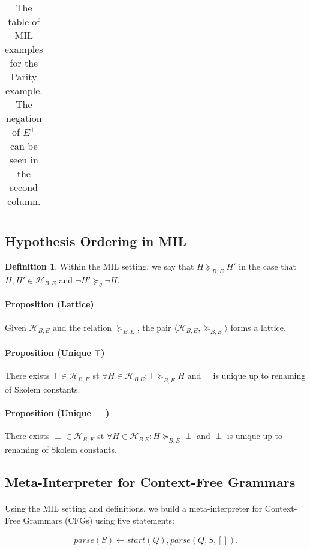 \documentclass{article}
\theoremstyle{plain}
\theoremstyle{definition}
\newtheorem{defn}[thm]{Definition} %
\begin{document}
\begin{multicols}{2}
\begin{table}[H]
\begin{tabular}{ | l | l | l | }
\hline
\end{tabular}
\caption{The table of MIL examples for the Parity example. The negation of $E^+$ can be seen in the second column.}
\end{table}

\subsection{Hypothesis Ordering in MIL}

\begin{defn}Within the MIL setting, we say that $H \succeq_{B,E} H'$ in the case that $H, H' \in \mathcal{H}_{B,E}$ and $\lnot H' \succeq_\theta \lnot H$.\end{defn}

\paragraph{Proposition (Lattice)} Given $\mathcal{H}_{B,E}$ and the relation $\succeq_{B,E}$, the pair $\langle \mathcal{H}_{B,E}, \succeq_{B,E} \rangle$ forms a lattice.

\paragraph{Proposition (Unique $\top$)} There exists $\top \in \mathcal{H}_{B,E}$ st $\forall H \in \mathcal{H}_{B.E}: \top \succeq_{B,E} H$ and $\top$ is unique up to renaming of Skolem constants.

\paragraph{Proposition (Unique $\perp$)} There exists $\perp \in \mathcal{H}_{B,E}$ st $\forall H \in \mathcal{H}_{B.E}: H \succeq_{B,E} \perp$ and $\perp$ is unique up to renaming of Skolem constants.

\subsection{Meta-Interpreter for Context-Free Grammars}

\paragraph{} Using the MIL setting and definitions, we build a meta-interpreter for Context-Free Grammars (CFGs) using five statements:

\begin{align*}
parse(S) \leftarrow start(Q), parse(Q, S, []).
\end{align*}


\end{multicols}
\end{document}
